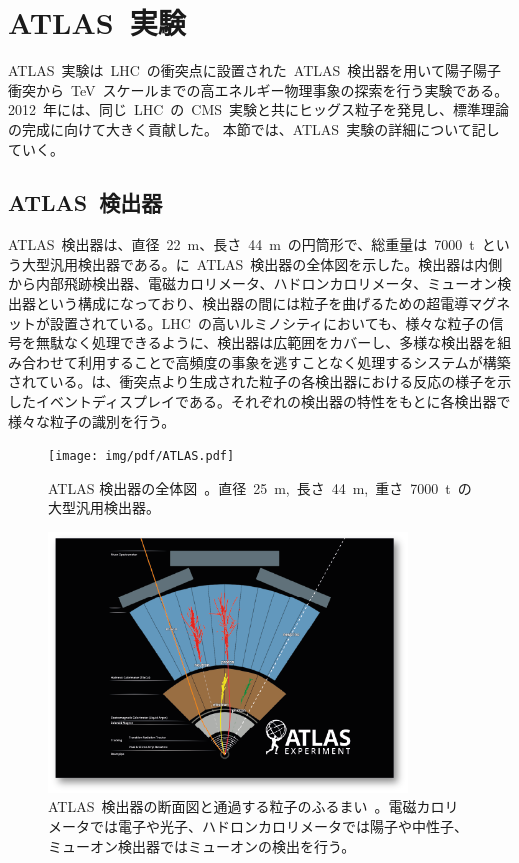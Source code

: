 \section{ATLAS~実験}
ATLAS~実験は~LHC~の衝突点に設置された~ATLAS~検出器を用いて陽子陽子衝突から~TeV~スケールまでの高エネルギー物理事象の探索を行う実験である。2012~年には、同じ~LHC~の~CMS~実験と共にヒッグス粒子を発見し、標準理論の完成に向けて大きく貢献した。
本節では、ATLAS~実験の詳細について記していく。
\subsection{ATLAS~検出器}
ATLAS~検出器は、直径~22~m、長さ~44~m~の円筒形で、総重量は~7000~t~という大型汎用検出器である。に~ATLAS~検出器の全体図を示した。検出器は内側から内部飛跡検出器、電磁カロリメータ、ハドロンカロリメータ、ミューオン検出器という構成になっており、検出器の間には粒子を曲げるための超電導マグネットが設置されている。LHC~の高いルミノシティにおいても、様々な粒子の信号を無駄なく処理できるように、検出器は広範囲をカバーし、多様な検出器を組み合わせて利用することで高頻度の事象を逃すことなく処理するシステムが構築されている。は、衝突点より生成された粒子の各検出器における反応の様子を示したイベントディスプレイである。それぞれの検出器の特性をもとに各検出器で様々な粒子の識別を行う。

\begin{figure}[H]
    \centering   
    \texttt{[image: img/pdf/ATLAS.pdf]}
    \caption[ATLAS 検出器の全体図]{ATLAS 検出器の全体図~\cite{TR:01}。直径~25~m,~長さ~44~m,~重さ~7000~t~の大型汎用検出器。}\label{fig:atlasdet}
\end{figure}

\begin{figure}[htbp]
    \centering   
    \includegraphics[width=0.85\textwidth]{img/jpeg/how.png}
    \caption[ATLAS~検出器の断面図と通過する粒子のふるまい]{ATLAS~検出器の断面図と通過する粒子のふるまい~\cite{URL:02}。電磁カロリメータでは電子や光子、ハドロンカロリメータでは陽子や中性子、ミューオン検出器ではミューオンの検出を行う。}
    \label{fig:disp}
\end{figure}

